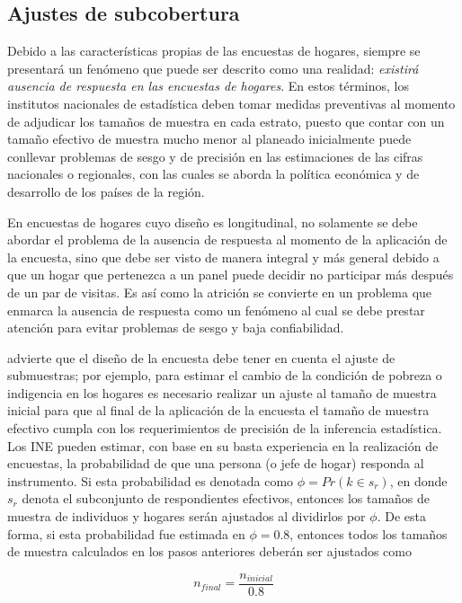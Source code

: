 \hypertarget{ajustes-de-subcobertura}{%
\subsection{Ajustes de subcobertura}\label{ajustes-de-subcobertura}}

Debido a las características propias de las encuestas de hogares, siempre se presentará un fenómeno que puede ser descrito como una realidad: \emph{existirá ausencia de respuesta en las encuestas de hogares}. En estos términos, los institutos nacionales de estadística deben tomar medidas preventivas al momento de adjudicar los tamaños de muestra en cada estrato, puesto que contar con un tamaño efectivo de muestra mucho menor al planeado inicialmente puede conllevar problemas de sesgo y de precisión en las estimaciones de las cifras nacionales o regionales, con las cuales se aborda la política económica y de desarrollo de los países de la región.

En encuestas de hogares cuyo diseño es longitudinal, no solamente se debe abordar el problema de la ausencia de respuesta al momento de la aplicación de la encuesta, sino que debe ser visto de manera integral y más general debido a que un hogar que pertenezca a un panel puede decidir no participar más después de un par de visitas. Es así como la atrición se convierte en un problema que enmarca la ausencia de respuesta como un fenómeno al cual se debe prestar atención para evitar problemas de sesgo y baja confiabilidad.

\citet{Kalton_2009} advierte que el diseño de la encuesta debe tener en cuenta el ajuste de submuestras; por ejemplo, para estimar el cambio de la condición de pobreza o indigencia en los hogares es necesario realizar un ajuste al tamaño de muestra inicial para que al final de la aplicación de la encuesta el tamaño de muestra efectivo cumpla con los requerimientos de precisión de la inferencia estadística. Los INE pueden estimar, con base en su basta experiencia en la realización de encuestas, la probabilidad de que una persona (o jefe de hogar) responda al instrumento. Si esta probabilidad es denotada como \(\phi=Pr(k \in s_r)\), en donde \(s_r\) denota el subconjunto de respondientes efectivos, entonces los tamaños de muestra de individuos y hogares serán ajustados al dividirlos por \(\phi\). De esta forma, si esta probabilidad fue estimada en \(\phi = 0.8\), entonces todos los tamaños de muestra calculados en los pasos anteriores deberán ser ajustados como

\[n_{final} = \frac{n_{inicial}}{0.8}\]

